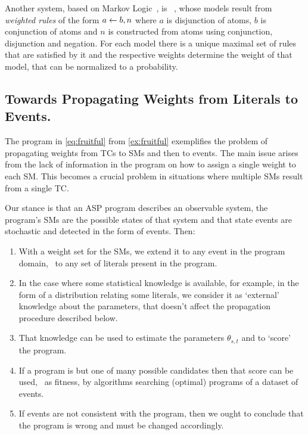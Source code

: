 \documentclass[x11names]{tlp}
\renewcommand{\cite}{\citep}
\begin{document}
Another system, based on Markov Logic~\cite{richardson2006markov}, is \lpmln~\cite{lee2016weighted,lee2017lpmln}, whose models result from \textit{weighted rules} of the form $a \leftarrow b, n$ where $a$ is disjunction of atoms, $b$ is conjunction of atoms and $n$ is constructed from atoms using conjunction, disjunction and negation.
For each model there is a unique maximal set of rules that are satisfied by it and the respective weights determine the weight of that model, that can be normalized to a probability.

\subsection*{Towards Propagating Weights from Literals to Events.}
\label{ssec:propagating.weights}

The program in \cref{eq:fruitful} from \cref{ex:fruitful} exemplifies the problem of propagating weights from \aclp{TC} to \aclp{SM} and then to events.
The main issue arises from the lack of information in the program on how to assign a single weight to each \acl{SM}.
This becomes a crucial problem in situations where multiple \aclp{SM} result from a single \acl{TC}.

Our stance is that an \ac{ASP} program describes an observable system, the program's \aclp{SM} are the possible states of that system and that state events are stochastic and detected in the form of events.
Then:
\begin{enumerate}

	\item With a weight set for the \aclp{SM}, we extend it to any event in the program domain, \ie\ to any set of literals present in the program.

	\item In the case where some statistical knowledge is available, for example, in the form of a distribution relating some literals, we consider it as `external' knowledge about the parameters, that doesn't affect the propagation procedure described below.

	\item That knowledge can be used to estimate the parameters $\theta_{s,t}$ and to `score' the program.

	\item\label{item:program.selection} If a program is but one of many possible candidates then that score can be used, \eg\ as fitness, by algorithms searching (optimal) programs of a dataset of events.

	\item If events are not consistent with the program, then we ought to conclude that the program is wrong and must be changed accordingly.

\end{enumerate}
\end{document}
